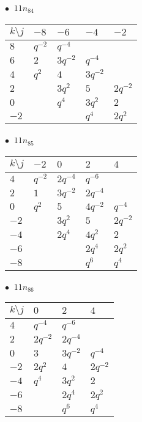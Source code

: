 %
\begin{minipage}{\linewidth}
$\bullet\ $ $11n_{84}$ \vspace{0.5em} \\
\begin{tabular}{l|llll}
$k \setminus j$ & $-8$ & $-6$ & $-4$ & $-2$ \\
\hline
$8$ & $q^{-2}$ & $q^{-4}$ &  &  \\
$6$ & $2$ & $3q^{-2}$ & $q^{-4}$ &  \\
$4$ & $q^{2}$ & $4$ & $3q^{-2}$ &  \\
$2$ &  & $3q^{2}$ & $5$ & $2q^{-2}$ \\
$0$ &  & $q^{4}$ & $3q^{2}$ & $2$ \\
$-2$ &  &  & $q^{4}$ & $2q^{2}$ \\
\end{tabular}
\vspace{2em}
\end{minipage}
%
\begin{minipage}{\linewidth}
$\bullet\ $ $11n_{85}$ \vspace{0.5em} \\
\begin{tabular}{l|llll}
$k \setminus j$ & $-2$ & $0$ & $2$ & $4$ \\
\hline
$4$ & $q^{-2}$ & $2q^{-4}$ & $q^{-6}$ &  \\
$2$ & $1$ & $3q^{-2}$ & $2q^{-4}$ &  \\
$0$ & $q^{2}$ & $5$ & $4q^{-2}$ & $q^{-4}$ \\
$-2$ &  & $3q^{2}$ & $5$ & $2q^{-2}$ \\
$-4$ &  & $2q^{4}$ & $4q^{2}$ & $2$ \\
$-6$ &  &  & $2q^{4}$ & $2q^{2}$ \\
$-8$ &  &  & $q^{6}$ & $q^{4}$ \\
\end{tabular}
\vspace{2em}
\end{minipage}
%
\begin{minipage}{\linewidth}
$\bullet\ $ $11n_{86}$ \vspace{0.5em} \\
\begin{tabular}{l|lll}
$k \setminus j$ & $0$ & $2$ & $4$ \\
\hline
$4$ & $q^{-4}$ & $q^{-6}$ &  \\
$2$ & $2q^{-2}$ & $2q^{-4}$ &  \\
$0$ & $3$ & $3q^{-2}$ & $q^{-4}$ \\
$-2$ & $2q^{2}$ & $4$ & $2q^{-2}$ \\
$-4$ & $q^{4}$ & $3q^{2}$ & $2$ \\
$-6$ &  & $2q^{4}$ & $2q^{2}$ \\
$-8$ &  & $q^{6}$ & $q^{4}$ \\
\end{tabular}
\vspace{2em}
\end{minipage}
